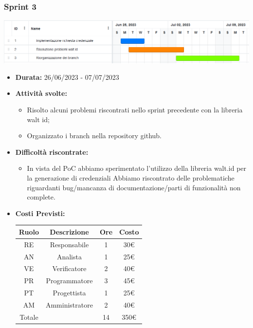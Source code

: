 \subsubsection{Sprint 3}
\begin{center}
    \includegraphics[scale = 0.5]{./res/img/Sprint_3.png}
  \end{center}
\begin{itemize}
    \item \textbf{Durata:} 26/06/2023 - 07/07/2023 
    \newpage
    \item \textbf{Attività svolte:}
    \begin{itemize}
        \item Risolto alcuni problemi riscontrati nello sprint precedente con la libreria walt id;
        \item Organizzato i branch nella repository github.
    \end{itemize}
    \item \textbf{Difficoltà riscontrate:}
    \begin{itemize}
        \item In vista del PoC abbiamo sperimentato l’utilizzo della libreria walt.id per la generazione di credenziali
        Abbiamo riscontrato delle problematiche riguardanti bug/mancanza di documentazione/parti di funzionalità non complete.
    \end{itemize}
    \item \textbf{Costi Previsti:}
    \begin{longtable}{|c|c|c|c|}
        \hline
        Ruolo & Descrizione & Ore & Costo \\
        \hline
        RE & Responsabile & 1 & 30€ \\
        \hline
        AN & Analista & 1 & 25€ \\
        \hline
        VE & Verificatore & 2 & 40€ \\
        \hline
        PR & Programmatore & 3 & 45€ \\
        \hline
        PT & Progettista & 1 & 25€ \\
        \hline
        AM & Amministratore & 2 & 40€ \\
        \hline
        Totale & & 14 & 350€ \\
        \hline
        \end{longtable}
        

\end{itemize}
